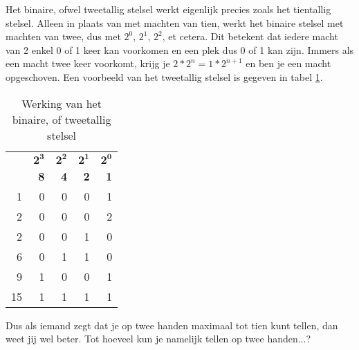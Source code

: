 \documentclass[10pt,a4paper,titlepage]{article}
\newcommand{\1}{\'{e}\'{e}n}
\begin{document}
Het binaire, ofwel tweetallig stelsel werkt eigenlijk precies zoals het tientallig stelsel. Alleen in plaats van met machten van tien, werkt het binaire stelsel met machten van twee, dus met $2^0$, $2^1$, $2^2$, et cetera. Dit betekent dat iedere macht van 2 enkel 0 of 1 keer kan voorkomen en een plek dus 0 of 1 kan zijn. Immers als een macht twee keer voorkomt, krijg je $2*2^n = 1*2^{n+1}$ en ben je een macht opgeschoven. Een voorbeeld van het tweetallig stelsel is gegeven in tabel \ref{tab:tweestelsel}.

\begin{table}[h!]
\caption{Werking van het binaire, of tweetallig stelsel}
\begin{tabular}{rrrrr}
    & $\mathbf{2^3}$    & $\mathbf{2^2}$    & $\mathbf{2^1}$    & $\mathbf{2^0}$\\
    & \textbf{8}        & \textbf{4}        & \textbf{2}        & \textbf{1}\\ \hline
1   & 0                 &   0               &   0               & 1\\
{\color{red}2}&  {\color{red}0} &   {\color{red}0}  &   {\color{red}0}  & {\color{red}2}\\
2   &   0               &   0               & 1                 & 0\\
6   &   0               & 1                 & 1                 & 0\\
9   &   1               &   0               & 0                 & 1\\
15 & 1                  & 1                 & 1                 & 1\\
\end{tabular}
\label{tab:tweestelsel}
\end{table}

Dus als iemand zegt dat je op twee handen maximaal tot tien kunt tellen, dan weet jij wel beter. Tot hoeveel kun je namelijk tellen op twee handen...?
\end{document}
